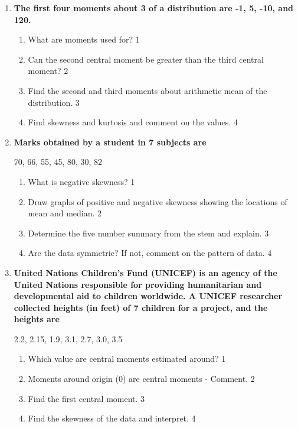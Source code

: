 \documentclass[a4paper,oneside]{book}
\begin{document}
\begin{enumerate}
 \item
	  \textbf{The first four moments about 3 of a distribution are -1, 5, -10, and 120.} 
  
  \begin{enumerate}
    \item
	What are moments used for? \hfill 1
    \item
	Can the second central moment be greater than the third central moment? \hfill 2
    \item  
	Find the second and third moments about arithmetic mean of the distribution. \hfill 3
    \item
	Find skewness and kurtosis and comment on the values.  \hfill 4
\end{enumerate}

 \item
	  \textbf{Marks obtained by a student in 7 subjects are} 
	  \begin{center}
	  70, 66, 55, 45, 80, 30, 82
	\end{center}
  
  \begin{enumerate}
    \item
	What is negative skewness? \hfill 1
    \item
	Draw graphs of positive and negative skewness showing the locations of mean and median. \hfill 2
    \item  
	Determine the five number summary from the stem and explain. \hfill 3
    \item
	Are the data symmetric? If not, comment on the pattern of data. \hfill 4
\end{enumerate}

 \item
	  \textbf{United Nations Children's Fund (UNICEF) is an agency of the United Nations responsible for providing humanitarian and developmental aid to children worldwide. A  UNICEF researcher collected heights (in feet) of 7 children for a project, and the heights are} 

	\begin{center}
	  2.2, 2.15, 1.9, 3.1, 2.7, 3.0, 3.5
	  	\end{center}
  
  \begin{enumerate}
    \item
	Which value are central moments estimated around? \hfill 1
    \item
	Moments around origin (0) are central moments - Comment. \hfill 2
    \item  
	Find the first central moment. \hfill 3
    \item
	Find the skewness of the data and interpret.  \hfill 4
  \end{enumerate}
  

\end{enumerate}
\end{document}
